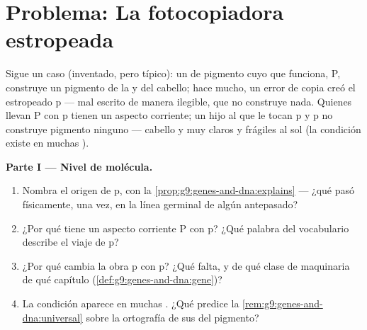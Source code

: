 \section{Problema: La fotocopiadora estropeada}

\begin{problem}\label{pb:g9:genes-and-dna:1}
Sigue un caso (inventado, pero típico): un  de pigmento cuyo 
que funciona, P, construye un pigmento de la  y del cabello; hace
mucho, un error de copia creó el  estropeado p --- mal escrito de
manera ilegible, que no construye nada. Quienes llevan P con p tienen
un aspecto corriente; un hijo al que le tocan p y p no construye
pigmento ninguno --- cabello y  muy claros y  frágiles al sol (la
condición existe en muchas ).

\medskip\noindent\textbf{Parte I --- Nivel de molécula.}
\begin{enumerate}
  \item Nombra el origen de p, con la
        \cref{prop:g9:genes-and-dna:explains} --- ¿qué pasó
        físicamente, una vez, en la línea germinal de algún antepasado?
  \item ¿Por qué tiene un aspecto corriente P con p? ¿Qué palabra del
        vocabulario describe el viaje de p?
  \item ¿Por qué cambia la obra p con p? ¿Qué falta, y de qué clase de
        maquinaria de qué capítulo
        (\cref{def:g9:genes-and-dna:gene})?
  \item La condición aparece en muchas . ¿Qué predice la
        \cref{rem:g9:genes-and-dna:universal} sobre la ortografía de
        sus  del pigmento?
\end{enumerate}


\end{problem}
